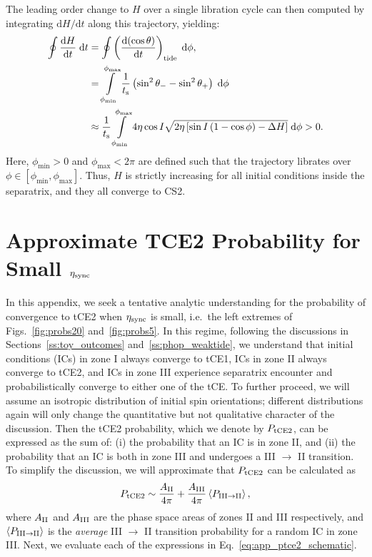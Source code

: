 \documentclass[
        fleqn,
        usenatbib,
        referee,
    ]{mnras}
\newcommand*{\rd}[2]{\frac{\mathrm{d}#1}{\mathrm{d}#2}}
\newcommand*{\rdil}[2]{\mathrm{d}#1/\mathrm{d}#2}
\newcommand*{\ev}[1]{\left\langle#1\right\rangle}
\newcommand*{\p}[1]{\left(#1\right)}
\newcommand*{\s}[1]{\left[#1\right]}
\begin{document}
The leading order change to $H$ over a single libration cycle can then computed by
integrating $\rdil{H}{t}$ along this trajectory, yielding:
\begin{align}
    \oint \rd{H}{t}\;\mathrm{d}t
        &= \oint \p{\rd{(\cos \theta)}{t}}_{\rm tide}
            \;\mathrm{d}\phi,\nonumber\\
        &= \int\limits_{\phi_{\min}}^{\phi_{\max}}
                \frac{1}{t_{\rm s}}
                \p{\sin^2\theta_- - \sin^2\theta_+} \;\mathrm{d}\phi\nonumber\\
        &\approx \frac{1}{t_{\rm s}}
            \int\limits_{\phi_{\min}}^{\phi_{\max}}
                4\eta \cos I \sqrt{2\eta\s{\sin I\p{1 - \cos \phi} - \Delta H}}
                \;\mathrm{d}\phi > 0.
\end{align}
Here, $\phi_{\min} > 0$ and $\phi_{\max} < 2\pi$ are defined such that the
trajectory librates over $\phi \in \s{\phi_{\min}, \phi_{\max}}$. Thus, $H$ is
strictly increasing for all initial conditions inside the separatrix, and they
all converge to CS2.

\section{Approximate TCE2 Probability for Small $\eta_{\rm sync}$
}\label{app:ptce2}

In this appendix, we seek a tentative analytic understanding for the
probability of convergence to tCE2 when $\eta_{\rm sync}$ is small, i.e.\ the
left extremes of Figs.~\ref{fig:probs20} and~\ref{fig:probs5}. In this regime,
following the discussions in Sections~\ref{ss:toy_outcomes}
and~\ref{ss:phop_weaktide}, we understand that initial conditions (ICs) in zone I
always converge to tCE1, ICs in zone II always converge to tCE2,
and ICs in zone III experience separatrix encounter and
probabilistically converge to either one of the tCE\@. To further proceed, we
will assume an isotropic distribution of initial spin orientations; different
distributions again will only change the quantitative but not qualitative
character of the discussion. Then the tCE2 probability, which we denote by
$P_{\rm tCE2}$, can be expressed as the sum of: (i) the probability that an IC
is in zone II, and (ii) the probability that an IC is both in zone III and
undergoes a III $\to$ II transition. To simplify the discussion, we will
approximate that $P_{\rm tCE2}$ can be calculated as
\begin{equation}
    P_{\rm tCE2} \sim \frac{A_{\rm II}}{4\pi}
            + \frac{A_{\rm III}}{4\pi}\ev{P_{\rm III \to II}},
            \label{eq:app_ptce2_schematic}
\end{equation}
where $A_{\rm II}$ and $A_{\rm III}$ are the phase space areas of zones II and
III respectively, and $\ev{P_{\rm III \to II}}$ is the \emph{average} III $\to$
II transition probability for a random IC in zone III\@. Next, we evaluate each
of the expressions in Eq.~\eqref{eq:app_ptce2_schematic}.
\end{document}
